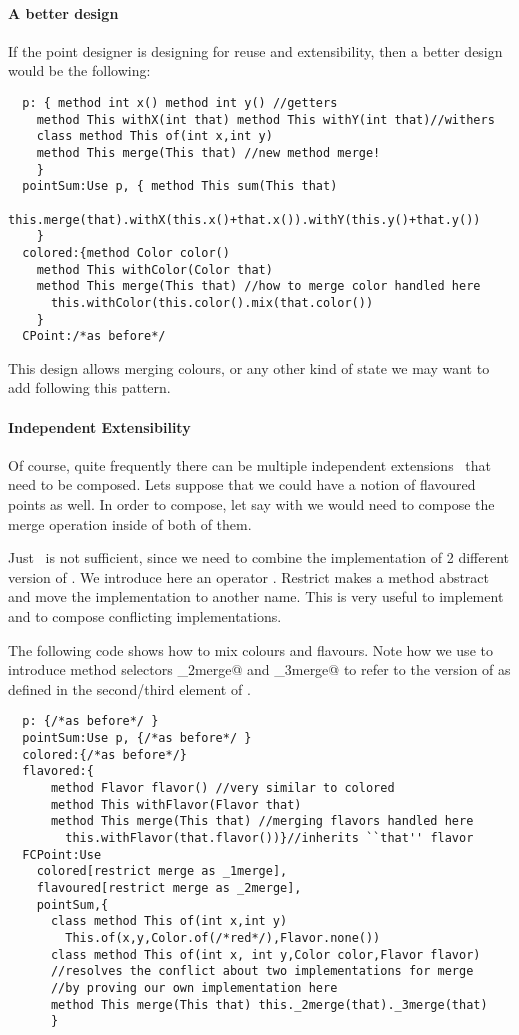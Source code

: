 \paragraph{A better design}
If the point designer is designing for reuse and extensibility, then 
a better design would be the following:  
\saveSpace\begin{lstlisting}
  p: { method int x() method int y() //getters
    method This withX(int that) method This withY(int that)//withers
    class method This of(int x,int y)
    method This merge(This that) //new method merge!
    }
  pointSum:Use p, { method This sum(This that)
      this.merge(that).withX(this.x()+that.x()).withY(this.y()+that.y())
    }
  colored:{method Color color()
    method This withColor(Color that)
    method This merge(This that) //how to merge color handled here
      this.withColor(this.color().mix(that.color())
    }
  CPoint:/*as before*/
\end{lstlisting}  \saveSpace
  \noindent This design allows merging colours, or any other kind of state we may want to add
  following this pattern.%

\paragraph{Independent Extensibility}
  Of course, quite frequently there can be multiple independent
  extensions~\cite{Zenger-Odersky2005} that need to be composed. Lets suppose that 
  we could have a notion of flavoured points as well.   
  In order to compose, let say \Q@colored@ with \Q@flavored@ we would
  need to compose the merge operation inside of both of them.

Just \use\ is not sufficient, since we need to combine the implementation of 2 different version of \Q@merge@.
We introduce here an operator \Q@restrict@.
Restrict makes a method abstract and
move the implementation to another name. This is very useful to implement \Q@super@
 and to compose conflicting implementations.

The following code shows how to mix colours and flavours. 
Note how we use \Q@restrict@ to introduce method selectors \Q@_2merge@ and \Q@_3merge@
to refer to the version of \Q@merge@ as defined in the second/third element of \use.
\saveSpace\begin{lstlisting}
  p: {/*as before*/ }
  pointSum:Use p, {/*as before*/ }
  colored:{/*as before*/}
  flavored:{
      method Flavor flavor() //very similar to colored
      method This withFlavor(Flavor that)
      method This merge(This that) //merging flavors handled here
        this.withFlavor(that.flavor())}//inherits ``that'' flavor
  FCPoint:Use
    colored[restrict merge as _1merge],
    flavoured[restrict merge as _2merge],
    pointSum,{
      class method This of(int x,int y)
        This.of(x,y,Color.of(/*red*/),Flavor.none())
      class method This of(int x, int y,Color color,Flavor flavor)
      //resolves the conflict about two implementations for merge
      //by proving our own implementation here
      method This merge(This that) this._2merge(that)._3merge(that)
      }
\end{lstlisting}  \saveSpace\saveSpace

